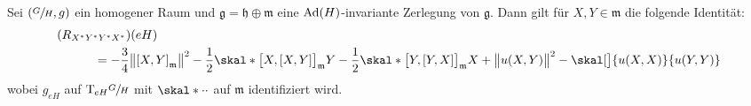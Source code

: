 \begin{satz}[label=satz:324,{name=[Formel für Krümmungstensor]}]
	Sei $\enbrace*{\sfrac{G}{H},g}$ ein homogener Raum und $\mathfrak{g} = \mathfrak{h} \oplus \mathfrak{m}$ eine $\Ad(H)$-invariante Zerlegung von $\mathfrak{g}$.
	Dann gilt für $X,Y \in \mathfrak{m}$ die folgende Identität:
	\begin{align}
		&\enbrace*{R_{X^*Y^*Y^*X^*}}(eH) \\
		&\hspace{3em} = -\frac{3}{4} \norm[\big]{\benbrace*{X,Y}_{\mathfrak{m}}}^2 - \frac{1}{2} \skal*{\benbrace[\big]{X, \benbrace*{X,Y}}_{\mathfrak{m}}}{Y} - \frac{1}{2} \skal*{\benbrace[\big]{Y, \benbrace*{Y,X}}_{\mathfrak{m}}}{X} + \norm[\big]{u(X,Y)}^2 - \skal[\big]{u(X,X)}{u(Y,Y)}
	\end{align}
	wobei $g_{eH}$ auf $\Tmap_{eH} \sfrac{G}{H}$ mit $\skal*{\cdot}{\cdot }$ auf $\mathfrak{m}$ identifiziert wird.
\end{satz}
